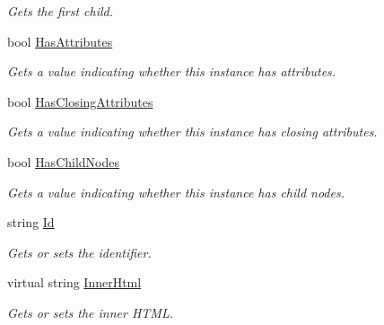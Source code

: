 \begin{DoxyCompactItemize}
\begin{DoxyCompactList}\small\item\em Gets the first child. \end{DoxyCompactList}\item 
bool \hyperlink{class_html_agility_pack_1_1_html_node_ac08a82a9fd7d48119a1e0846fa2bee9c}{Has\+Attributes}
\begin{DoxyCompactList}\small\item\em Gets a value indicating whether this instance has attributes. \end{DoxyCompactList}\item 
bool \hyperlink{class_html_agility_pack_1_1_html_node_aa85f2da871813b19057b169813d9df4e}{Has\+Closing\+Attributes}
\begin{DoxyCompactList}\small\item\em Gets a value indicating whether this instance has closing attributes. \end{DoxyCompactList}\item 
bool \hyperlink{class_html_agility_pack_1_1_html_node_a42c77171e906aa41e42b03eaccf5635d}{Has\+Child\+Nodes}
\begin{DoxyCompactList}\small\item\em Gets a value indicating whether this instance has child nodes. \end{DoxyCompactList}\item 
string \hyperlink{class_html_agility_pack_1_1_html_node_a8d32bc2ec79d6bd945618068c0e5527b}{Id}
\begin{DoxyCompactList}\small\item\em Gets or sets the identifier. \end{DoxyCompactList}\item 
virtual string \hyperlink{class_html_agility_pack_1_1_html_node_a14604670771b05a2cf2d7a54d2fbb27f}{Inner\+Html}
\begin{DoxyCompactList}\small\item\em Gets or sets the inner H\+T\+ML. \end{DoxyCompactList}\item 

\end{DoxyCompactItemize}

